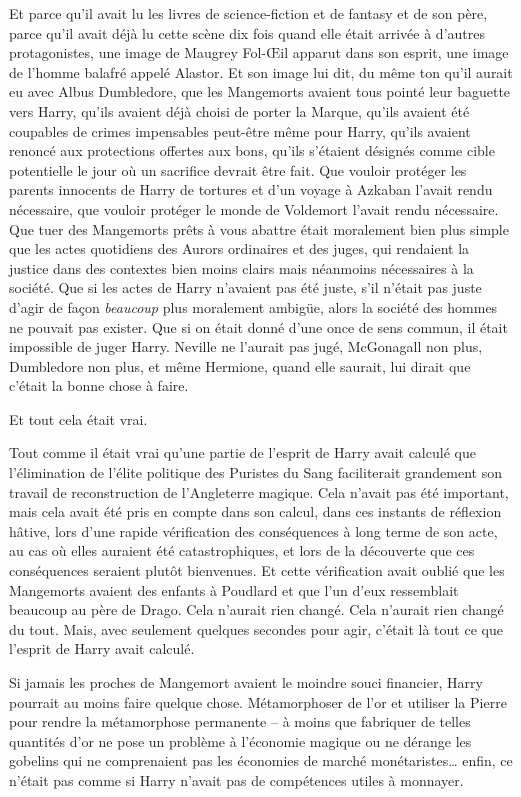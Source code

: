 Et parce qu'il avait lu les livres de science-fiction et de fantasy et de son père, parce qu'il avait déjà lu cette scène dix fois quand elle était arrivée à d'autres protagonistes, une image de Maugrey Fol-Œil apparut dans son esprit, une image de l'homme balafré appelé Alastor. Et son image lui dit, du même ton qu'il aurait eu avec Albus Dumbledore, que les Mangemorts avaient tous pointé leur baguette vers Harry, qu'ils avaient déjà choisi de porter la Marque, qu'ils avaient été coupables de crimes impensables peut-être même pour Harry, qu'ils avaient renoncé aux protections offertes aux bons, qu'ils s'étaient désignés comme cible potentielle le jour où un sacrifice devrait être fait. Que vouloir protéger les parents innocents de Harry de tortures et d'un voyage à Azkaban l'avait rendu nécessaire, que vouloir protéger le monde de Voldemort l'avait rendu nécessaire. Que tuer des Mangemorts prêts à vous abattre était moralement bien plus simple que les actes quotidiens des Aurors ordinaires et des juges, qui rendaient la justice dans des contextes bien moins clairs mais néanmoins nécessaires à la société. Que si les actes de Harry n'avaient pas été juste, s'il n'était pas juste d'agir de façon \emph{beaucoup} plus moralement ambigüe, alors la société des hommes ne pouvait pas exister. Que si on était donné d'une once de sens commun, il était impossible de juger Harry. Neville ne l'aurait pas jugé, McGonagall non plus, Dumbledore non plus, et même Hermione, quand elle saurait, lui dirait que c'était la bonne chose à faire.

Et tout cela était vrai.

Tout comme il était vrai qu'une partie de l'esprit de Harry avait calculé que l'élimination de l'élite politique des Puristes du Sang faciliterait grandement son travail de reconstruction de l'Angleterre magique. Cela n'avait pas été important, mais cela avait été pris en compte dans son calcul, dans ces instants de réflexion hâtive, lors d'une rapide vérification des conséquences à long terme de son acte, au cas où elles auraient été catastrophiques, et lors de la découverte que ces conséquences seraient plutôt bienvenues. Et cette vérification avait oublié que les Mangemorts avaient des enfants à Poudlard et que l'un d'eux ressemblait beaucoup au père de Drago. Cela n'aurait rien changé. Cela n'aurait rien changé du tout. Mais, avec seulement quelques secondes pour agir, c'était là tout ce que l'esprit de Harry avait calculé.

Si jamais les proches de Mangemort avaient le moindre souci financier, Harry pourrait au moins faire quelque chose. Métamorphoser de l'or et utiliser la Pierre pour rendre la métamorphose permanente -- à moins que fabriquer de telles quantités d'or ne pose un problème à l'économie magique ou ne dérange les gobelins qui ne comprenaient pas les économies de marché monétaristes… enfin, ce n'était pas comme si Harry n'avait pas de compétences utiles à monnayer.

